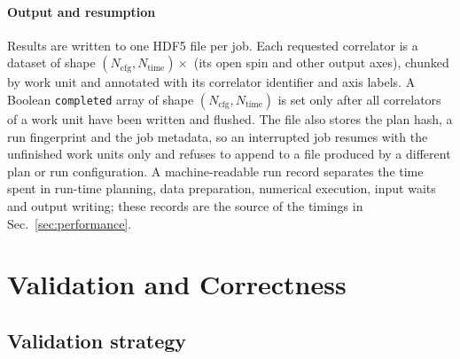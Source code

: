 \documentclass[a4paper,fleqn]{cas-dc}
\begin{document}
\paragraph{Output and resumption}
Results are written to one HDF5 file per job. Each requested correlator is a
dataset of shape \((N_{\mathrm{cfg}}, N_{\mathrm{time}}) \times\) (its open spin
and other output axes), chunked by work unit and annotated with its correlator
identifier and axis labels. A Boolean \texttt{completed} array of shape
\((N_{\mathrm{cfg}}, N_{\mathrm{time}})\) is set only after all correlators of a
work unit have been written and flushed. The file also stores the plan hash, a
run fingerprint and the job metadata, so an interrupted job resumes with the
unfinished work units only and refuses to append to a file produced by a
different plan or run configuration. A machine-readable run record separates the
time spent in run-time planning, data preparation, numerical execution, input
waits and output writing; these records are the source of the timings in
Sec.~\ref{sec:performance}.

\section{Validation and Correctness}
\label{sec:validation}

\subsection{Validation strategy}
\label{sec:validation_strategy}
\end{document}
